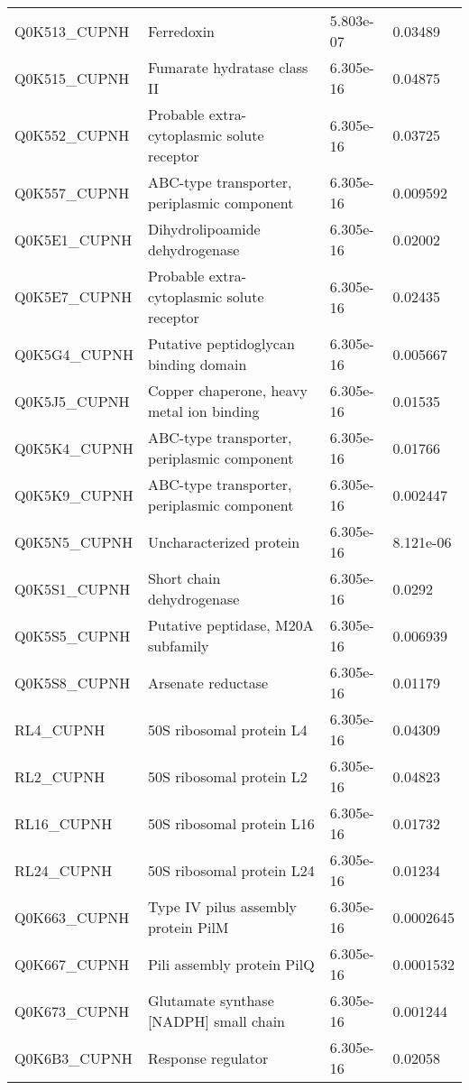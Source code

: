 \begin{center}
\begin{longtable}{ l l l l }
Q0K513\_CUPNH & Ferredoxin& 5.803e-07 & 0.03489 \\ [0.5ex]
Q0K515\_CUPNH & Fumarate hydratase class II& 6.305e-16 & 0.04875 \\ [0.5ex]
Q0K552\_CUPNH & Probable extra-cytoplasmic solute receptor& 6.305e-16 & 0.03725 \\ [0.5ex]
Q0K557\_CUPNH & ABC-type transporter, periplasmic component& 6.305e-16 & 0.009592 \\ [0.5ex]
Q0K5E1\_CUPNH & Dihydrolipoamide dehydrogenase& 6.305e-16 & 0.02002 \\ [0.5ex]
Q0K5E7\_CUPNH & Probable extra-cytoplasmic solute receptor & 6.305e-16 & 0.02435 \\ [0.5ex]
Q0K5G4\_CUPNH & Putative peptidoglycan binding domain& 6.305e-16 & 0.005667 \\ [0.5ex]
Q0K5J5\_CUPNH & Copper chaperone, heavy metal ion binding& 6.305e-16 & 0.01535 \\ [0.5ex]
Q0K5K4\_CUPNH & ABC-type transporter, periplasmic component& 6.305e-16 & 0.01766 \\ [0.5ex]
Q0K5K9\_CUPNH & ABC-type transporter, periplasmic component& 6.305e-16 & 0.002447 \\ [0.5ex]
Q0K5N5\_CUPNH & Uncharacterized protein& 6.305e-16 & 8.121e-06 \\ [0.5ex]
Q0K5S1\_CUPNH & Short chain dehydrogenase& 6.305e-16 & 0.0292 \\ [0.5ex]
Q0K5S5\_CUPNH & Putative peptidase, M20A subfamily& 6.305e-16 & 0.006939 \\ [0.5ex]
Q0K5S8\_CUPNH & Arsenate reductase& 6.305e-16 & 0.01179 \\ [0.5ex]
RL4\_CUPNH & 50S ribosomal protein L4& 6.305e-16 & 0.04309 \\ [0.5ex]
RL2\_CUPNH & 50S ribosomal protein L2& 6.305e-16 & 0.04823 \\ [0.5ex]
RL16\_CUPNH & 50S ribosomal protein L16& 6.305e-16 & 0.01732 \\ [0.5ex]
RL24\_CUPNH & 50S ribosomal protein L24& 6.305e-16 & 0.01234 \\ [0.5ex]
Q0K663\_CUPNH & Type IV pilus assembly protein PilM& 6.305e-16 & 0.0002645 \\ [0.5ex]
Q0K667\_CUPNH & Pili assembly protein PilQ& 6.305e-16 & 0.0001532 \\ [0.5ex]
Q0K673\_CUPNH & Glutamate synthase [NADPH] small chain& 6.305e-16 & 0.001244 \\ [0.5ex]
Q0K6B3\_CUPNH & Response regulator & 6.305e-16 & 0.02058 \\ [0.5ex]

\end{longtable}
\end{center}
